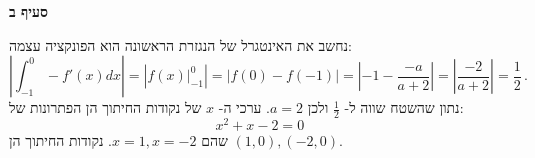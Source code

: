 \textbf{סעיף ב}

נחשב את האינטגרל של הנגזרת הראשונה הוא הפונקציה עצמה:
\[
\left|\int_{-1}^0 -f'(x) dx\right| = \left|\left.f(x)\right|_{-1}^0\right|=\left|f(0)-f(-1)\right|=\left|-1-\frac{-a}{a+2}\right|=\left|\frac{-2}{a+2}\right|=\frac{1}{2}\,.
\]
נתון שהשטח שווה ל-%
$\frac{1}{2}$
ולכן 
$a=2$.
ערכי ה-%
$x$
של נקודות החיתוך הן הפתרונות של:
\[
x^2+x-2=0\,
\]
שהם
$x=1,x=-2$.
נקודות החיתוך הן
$(1,0), (-2,0)$.


\np


